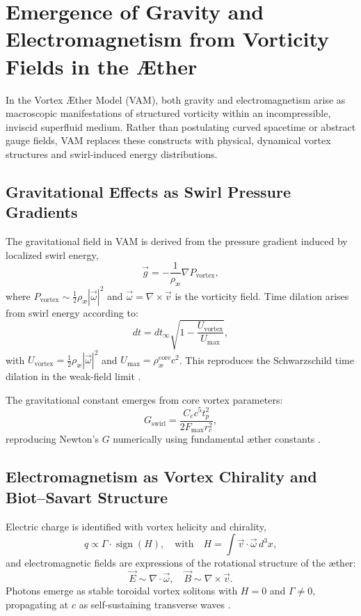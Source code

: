 \section{Emergence of Gravity and Electromagnetism from Vorticity Fields in the Æther}

In the Vortex Æther Model (VAM), both gravity and electromagnetism arise as macroscopic manifestations of structured vorticity within an incompressible, inviscid superfluid medium. Rather than postulating curved spacetime or abstract gauge fields, VAM replaces these constructs with physical, dynamical vortex structures and swirl-induced energy distributions.

\subsection{Gravitational Effects as Swirl Pressure Gradients}

The gravitational field in VAM is derived from the pressure gradient induced by localized swirl energy,
\begin{equation}
\vec{g} = -\frac{1}{\rho_\text{\ae}} \nabla P_{\text{vortex}},
\end{equation}
where $P_{\text{vortex}} \sim \frac{1}{2} \rho_\text{\ae} |\vec{\omega}|^2$ and $\vec{\omega} = \nabla \times \vec{v}$ is the vorticity field. Time dilation arises from swirl energy according to:
\begin{equation}
dt = dt_\infty \sqrt{1 - \frac{U_{\text{vortex}}}{U_{\text{max}}}},
\end{equation}
with $U_{\text{vortex}} = \frac{1}{2} \rho_\text{\ae} |\vec{\omega}|^2$ and $U_{\text{max}} = \rho_\text{\ae}^\text{core} c^2$. This reproduces the Schwarzschild time dilation in the weak-field limit \cite{MTW1973}.

The gravitational constant emerges from core vortex parameters:
\begin{equation}
G_\text{swirl} = \frac{C_e c^5 t_p^2}{2 F_{\text{max}} r_c^2},
\end{equation}
reproducing Newton's $G$ numerically using fundamental æther constants \cite{Iskandarani2025VAM}.

\subsection{Electromagnetism as Vortex Chirality and Biot–Savart Structure}

Electric charge is identified with vortex helicity and chirality,
\begin{equation}
q \propto \Gamma \cdot \operatorname{sign}(H), \quad \text{with} \quad H = \int \vec{v} \cdot \vec{\omega} \, d^3x,
\end{equation}
and electromagnetic fields are expressions of the rotational structure of the æther:
\begin{equation}
\vec{E} \sim \nabla \cdot \vec{\omega}, \quad \vec{B} \sim \nabla \times \vec{v}.
\end{equation}
Photons emerge as stable toroidal vortex solitons with $H = 0$ and $\Gamma \neq 0$, propagating at $c$ as self-sustaining transverse waves \cite{Battye1998,Ranada1989}.


